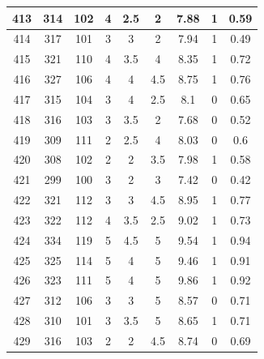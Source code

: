 \documentclass[11pt]{article}
\begin{document}
\begin{appendix}
\begin{longtable}[H]{|c|c|c|c|c|c|c|c|c|}
	413        & 314       & 102         & 4                 & 2.5 & 2   & 7.88 & 1        & 0.59            \\ \hline
	414        & 317       & 101         & 3                 & 3   & 2   & 7.94 & 1        & 0.49            \\ \hline
	415        & 321       & 110         & 4                 & 3.5 & 4   & 8.35 & 1        & 0.72            \\ \hline
	416        & 327       & 106         & 4                 & 4   & 4.5 & 8.75 & 1        & 0.76            \\ \hline
	417        & 315       & 104         & 3                 & 4   & 2.5 & 8.1  & 0        & 0.65            \\ \hline
	418        & 316       & 103         & 3                 & 3.5 & 2   & 7.68 & 0        & 0.52            \\ \hline
	419        & 309       & 111         & 2                 & 2.5 & 4   & 8.03 & 0        & 0.6             \\ \hline
	420        & 308       & 102         & 2                 & 2   & 3.5 & 7.98 & 1        & 0.58            \\ \hline
	421        & 299       & 100         & 3                 & 2   & 3   & 7.42 & 0        & 0.42            \\ \hline
	422        & 321       & 112         & 3                 & 3   & 4.5 & 8.95 & 1        & 0.77            \\ \hline
	423        & 322       & 112         & 4                 & 3.5 & 2.5 & 9.02 & 1        & 0.73            \\ \hline
	424        & 334       & 119         & 5                 & 4.5 & 5   & 9.54 & 1        & 0.94            \\ \hline
	425        & 325       & 114         & 5                 & 4   & 5   & 9.46 & 1        & 0.91            \\ \hline
	426        & 323       & 111         & 5                 & 4   & 5   & 9.86 & 1        & 0.92            \\ \hline
	427        & 312       & 106         & 3                 & 3   & 5   & 8.57 & 0        & 0.71            \\ \hline
	428        & 310       & 101         & 3                 & 3.5 & 5   & 8.65 & 1        & 0.71            \\ \hline
	429        & 316       & 103         & 2                 & 2   & 4.5 & 8.74 & 0        & 0.69            \\ \hline

\end{longtable}
\end{appendix}
\end{document}
